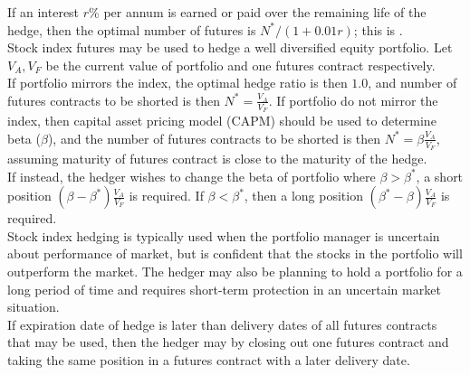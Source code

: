 If an interest $r\%$ per annum is earned or paid over the remaining life of the hedge, then the optimal number of futures is $N^* / (1+0.01r)$; this is .\\

Stock index futures may be used to hedge a well diversified equity portfolio. Let $V_A, V_F$ be the current value of portfolio and one futures contract respectively.\\
If portfolio mirrors the index, the optimal hedge ratio is then $1.0$, and number of futures contracts to be shorted is then $N^* = \frac{V_A}{V_F}$. If portfolio do not mirror the index, then capital asset pricing model (CAPM) should be used to determine beta ($\beta$), and the number of futures contracts to be shorted is then $N^* = \beta \frac{V_A}{V_F}$, assuming maturity of futures contract is close to the maturity of the hedge.\\

If instead, the hedger wishes to change the beta of portfolio where $\beta > \beta^*$, a short position $(\beta - \beta^*)\frac{V_A}{V_F}$ is required. If $\beta < \beta^*$, then a long position $(\beta^* - \beta)\frac{V_A}{V_F}$ is required.\\

Stock index hedging is typically used when the portfolio manager is uncertain about performance of market, but is confident that the stocks in the portfolio will outperform the market. The hedger may also be planning to hold a portfolio for a long period of time and requires short-term protection in an uncertain market situation.\\

If expiration date of hedge is later than delivery dates of all futures contracts that may be used, then the hedger may  by closing out one futures contract and taking the same position in a futures contract with a later delivery date.



